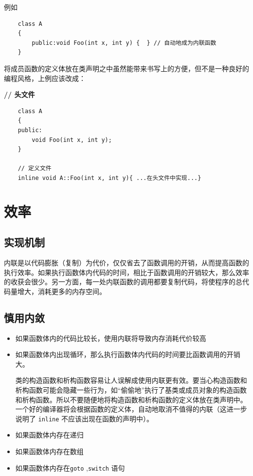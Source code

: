 \documentclass[UTF8,a4paper,12pt]{ctexbook} %
\begin{document}
		       例如
		       \begin{lstlisting}
	class A
	{
		public:void Foo(int x, int y) {  } // 自动地成为内联函数
	}
		       \end{lstlisting}
		       
		       将成员函数的定义体放在类声明之中虽然能带来书写上的方便，但不是一种良好的编程风格，上例应该改成：
		       
		       \textbf{// 头文件}
		       
		        \begin{lstlisting}
	class A
	{
	public:
		void Foo(int x, int y);
	}		        
	
	// 定义文件
	inline void A::Foo(int x, int y){ ...在头文件中实现...} 
		        \end{lstlisting}
		       
    \section{效率}
	       \subsection{实现机制}内联是以代码膨胀（复制）为代价，仅仅省去了函数调用的开销，从而提高函数的执行效率。如果执行函数体内代码的时间，相比于函数调用的开销较大，那么效率的收获会很少。另一方面，每一处内联函数的调用都要复制代码，将使程序的总代码量增大，消耗更多的内存空间。
       
	       \subsection{慎用内敛}
		       \begin{itemize}
		       	\item  如果函数体内的代码比较长，使用内联将导致内存消耗代价较高
		       	\item  如果函数体内出现循环，那么执行函数体内代码的时间要比函数调用的开销大。
       	
		       	类的构造函数和析构函数容易让人误解成使用内联更有效。要当心构造函数和析构函数可能会隐藏一些行为，如“偷偷地”执行了基类或成员对象的构造函数和析构函数。所以不要随便地将构造函数和析构函数的定义体放在类声明中。一个好的编译器将会根据函数的定义体，自动地取消不值得的内联（这进一步说明了 \verb|inline| 不应该出现在函数的声明中）。
		       	\item 如果函数体内存在递归
		       	\item 如果函数体内存在数组
		       	\item 如果函数体内存在\verb|goto| ,\verb|switch| 语句
		       \end{itemize}
     
\end{document}
